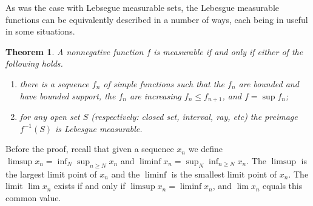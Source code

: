 \documentclass[11pt,oneside]{amsbook}
\theoremstyle{definition}
\theoremstyle{plain}
\newtheorem{thm}{Theorem}[section]
\theoremstyle{definition}
\theoremstyle{remark}
\numberwithin{equation}{section}
\numberwithin{figure}{section}
\begin{document}
As was the case with Lebsegue measurable sets, the Lebesgue measurable functions can be equivalently described in a number of ways, each being in useful in some situations.

\begin{thm}
  \label{thm:measurable-equiv}
  A nonnegative function $f$ is measurable if and only if either of the following holds.
  \begin{enumerate}
  \item there is a sequence $f_n$ of simple functions such that the $f_n$ are bounded and have bounded support, the $f_n$ are increasing $f_n\leq f_{n+1}$, and $f=\sup f_n$;
  \item for any open set $S$ (respectively: closed set, interval, ray, etc) the preimage $f^{-1}(S)$ is Lebesgue measurable.
  \end{enumerate}
\end{thm}

Before the proof, recall that given a sequence $x_n$ we define $\limsup x_n=\inf_N\sup_{n\geq N}x_n$ and $\liminf x_n=\sup_N\inf_{n\geq N}x_n$. The $\limsup$ is the largest limit point of $x_n$ and the $\liminf$ is the smallest limit point of $x_n$. The limit $\lim x_n$ exists if and only if $\limsup x_n=\liminf x_n$, and $\lim x_n$ equals this common value.
\end{document}
